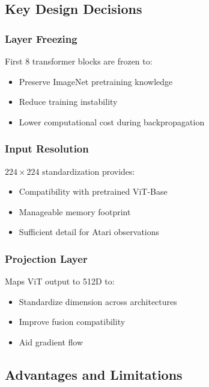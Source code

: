 \documentclass[12pt,a4paper,openany]{report}
\begin{document}
\subsection{Key Design Decisions}

\subsubsection{Layer Freezing}

First 8 transformer blocks are frozen to:

\begin{itemize}
    \item Preserve ImageNet pretraining knowledge
    \item Reduce training instability
    \item Lower computational cost during backpropagation
\end{itemize}

\subsubsection{Input Resolution}

$224 \times 224$ standardization provides:

\begin{itemize}
    \item Compatibility with pretrained ViT-Base
    \item Manageable memory footprint
    \item Sufficient detail for Atari observations
\end{itemize}

\subsubsection{Projection Layer}

Maps ViT output to 512D to:

\begin{itemize}
    \item Standardize dimension across architectures
    \item Improve fusion compatibility
    \item Aid gradient flow
\end{itemize}

\subsection{Advantages and Limitations}
\end{document}
